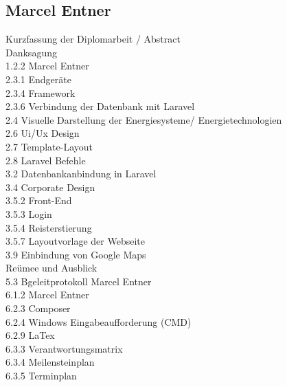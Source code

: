 \subsection{Marcel Entner}
Kurzfassung der Diplomarbeit / Abstract \\
Danksagung \\
1.2.2 Marcel Entner \\
2.3.1 Endgeräte \\ 
2.3.4 Framework \\
2.3.6 Verbindung der Datenbank mit Laravel \\
2.4 Visuelle Darstellung der Energiesysteme/ Energietechnologien  \\
2.6 Ui/Ux Design  \\
2.7 Template-Layout  \\
2.8 Laravel Befehle \\
3.2 Datenbankanbindung in Laravel \\
3.4 Corporate Design \\
3.5.2 Front-End \\
3.5.3 Login \\
3.5.4 Reisterstierung \\
3.5.7 Layoutvorlage der Webseite \\
3.9 Einbindung von Google Maps \\
Reümee und Ausblick\\
5.3 Bgeleitprotokoll Marcel Entner\\
6.1.2 Marcel Entner\\
6.2.3 Composer \\
6.2.4 Windows Eingabeaufforderung (CMD) \\
6.2.9 LaTex  \\
6.3.3 Verantwortungsmatrix\\
6.3.4 Meilensteinplan \\
6.3.5 Terminplan \\


